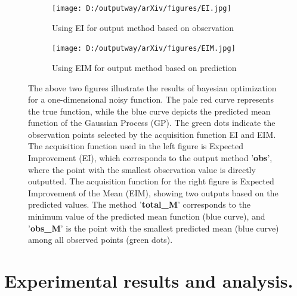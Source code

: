 \documentclass{article}
\begin{document}
\begin{figure}[H]
    \centering
    \begin{subfigure}[t]{.42\linewidth}
        \centering
        \texttt{[image: D:/outputway/arXiv/figures/EI.jpg]}
        \caption{Using EI for output method based on observation}
    \end{subfigure}
    \begin{subfigure}[t]{.42\linewidth}
        \centering
        \texttt{[image: D:/outputway/arXiv/figures/EIM.jpg]}
        \caption{Using EIM for output method based on prediction}
    \end{subfigure}
    \caption{The above two figures illustrate the results of bayesian optimization for a one-dimensional noisy function. The pale red curve represents the true function, while the blue curve depicts the predicted mean function of the Gaussian Process (GP). The green dots indicate the observation points selected by the acquisition function EI and EIM. The acquisition function used in the left figure is Expected Improvement (EI), which corresponds to the output method '\textbf{obs}', where the point with the smallest observation value is directly outputted. The acquisition function for the right figure is Expected Improvement of the Mean (EIM), showing two outputs based on the predicted values. The method '\textbf{total\_M}' corresponds to the minimum value of the predicted mean function (blue curve), and '\textbf{obs\_M}' is the point with the smallest predicted mean (blue curve) among all observed points (green dots).}
    \label{Fig1}
\end{figure}




\section{Experimental results and analysis.}
\end{document}

